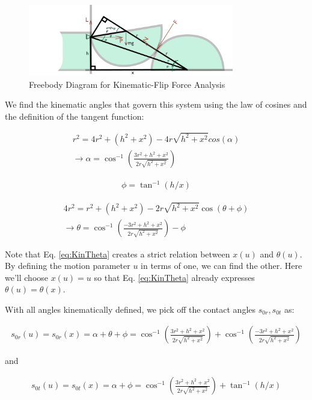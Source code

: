 \documentclass[letterpaper]{report}
\begin{document}
\begin{figure}[ht]
\centering
\includegraphics[width=0.8\textwidth]{Kin_FreeBodyDiagram.png}
\caption{\label{fig:KinFreebody}Freebody Diagram for Kinematic-Flip Force Analysis}
\end{figure}

We find the kinematic angles that govern this system using the law of cosines and the definition of the tangent function:

\begin{align}
  r^2 = 4 r^2 + (h^2 + x^2) - 4r \sqrt{h^2 + x^2} cos(\alpha) \\
  \rightarrow \alpha = \cos^{-1} \left( \frac{3r^2 + h^2 + x^2}{2r \sqrt{h^2 + x^2}} \right)
\end{align}

\begin{align}
  \phi = \tan^{-1}(h/x)
\end{align}

\begin{align}
  4 r^2 = r^2 + (h^2 + x^2) - 2r \sqrt{h^2 + x^2} \cos(\theta + \phi) \\
  \rightarrow \theta = \cos^{-1} \left( \frac{-3r^2 + h^2 + x^2}{2r \sqrt{h^2 + x^2}} \right) - \phi \label{eq:KinTheta}
\end{align}

Note that Eq. \ref{eq:KinTheta} creates a strict relation between $x(u)$ and $\theta(u)$.
By defining the motion parameter $u$ in terms of one, we can find the other.
Here we'll choose $x(u) = u$ so that Eq. \ref{eq:KinTheta} already expresses $\theta(u) = \theta(x)$.

With all angles kinematically defined, we pick off the contact angles $s_{0r}, s_{0t}$ as:

\begin{align}
  s_{0r}(u) = s_{0r}(x) = \alpha + \theta + \phi = \cos^{-1} \left( \frac{3r^2 + h^2 + x^2}{2r \sqrt{h^2 + x^2}} \right) + \cos^{-1} \left( \frac{-3r^2 + h^2 + x^2}{2r \sqrt{h^2 + x^2}} \right)
\end{align}

and

\begin{align}
  s_{0t}(u) = s_{0t}(x) = \alpha + \phi = \cos^{-1} \left( \frac{3r^2 + h^2 + x^2}{2r \sqrt{h^2 + x^2}} \right) + \tan^{-1}(h/x)
\end{align}
\end{document}
